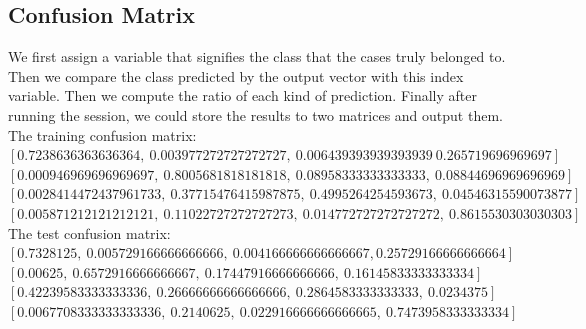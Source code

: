 \documentclass{article}
\begin{document}
  \subsection{Confusion Matrix}
  We first assign a variable that signifies the class that the cases truly belonged to. Then we compare the class predicted by the output vector with this index variable. Then we compute the ratio of each kind of prediction. Finally after running the session, we could store the results to two matrices and output them.\\
  The training confusion matrix:\\
$[0.7238636363636364,\ 0.003977272727272727,\ 0.006439393939393939\ 0.265719696969697]$\\
$[0.000946969696969697,\ 0.8005681818181818,\ 0.08958333333333333,\ 0.08844696969696969]$\\ 
$[0.0028414472437961733,\ 0.37715476415987875,\ 0.4995264254593673,\ 0.04546315590073877]$\\ 
$[0.005871212121212121,\ 0.11022727272727273,\ 0.014772727272727272,\ 0.8615530303030303]$\\
The test confusion matrix:\\
$[0.7328125,\ 0.005729166666666666,\ 0.004166666666666667,0.25729166666666664]$\\
$[0.00625,\ 0.6572916666666667,\ 0.17447916666666666,\ 0.16145833333333334]$\\
$[0.42239583333333336,\ 0.26666666666666666,\ 0.2864583333333333,\ 0.0234375]$\\ 
$[0.0067708333333333336,\ 0.2140625,\ 0.022916666666666665,\ 0.7473958333333334]$\\
\end{document}
